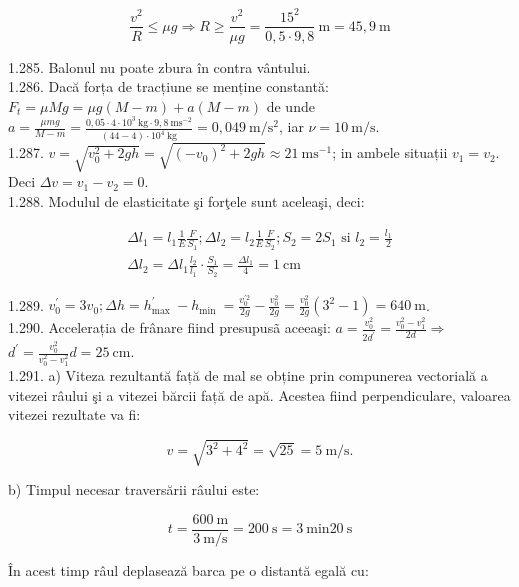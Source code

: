 \documentclass[10pt]{article}
\begin{document}
$$
\frac{v^{2}}{R} \leq \mu g \Rightarrow R \geq \frac{v^{2}}{\mu g}=\frac{15^{2}}{0,5 \cdot 9,8} \mathrm{~m}=45,9 \mathrm{~m}
$$

1.285. Balonul nu poate zbura în contra vântului.\\
1.286. Dacă forța de tracțiune se menține constantă:\\
$F_{t}=\mu M g=\mu g(M-m)+a(M-m)$ de unde\\
$a=\frac{\mu m g}{M-m}=\frac{0,05 \cdot 4 \cdot 10^{3} \mathrm{~kg} \cdot 9,8 \mathrm{~ms}^{-2}}{(44-4) \cdot 10^{4} \mathrm{~kg}}=0,049 \mathrm{~m} / \mathrm{s}^{2}$, iar $\nu=10 \mathrm{~m} / \mathrm{s}$.\\
1.287. $v=\sqrt{v_{0}^{2}+2 g h}=\sqrt{\left(-v_{0}\right)^{2}+2 g h} \approx 21 \mathrm{~ms}^{-1}$; in ambele situații $v_{1}=v_{2}$. Deci $\Delta v=v_{1}-v_{2}=0$.\\
1.288. Modulul de elasticitate şi forţele sunt aceleaşi, deci:

$$
\begin{gathered}
\Delta l_{1}=l_{1} \frac{1}{E} \frac{F}{S_{1}} ; \Delta l_{2}=l_{2} \frac{1}{E} \frac{F}{S_{2}} ; S_{2}=2 S_{1} \text { si } l_{2}=\frac{l_{1}}{2} \\
\Delta l_{2}=\Delta l_{1} \frac{l_{2}}{l_{1}} \cdot \frac{S_{1}}{S_{2}}=\frac{\Delta l_{1}}{4}=1 \mathrm{~cm}
\end{gathered}
$$

1.289. $v_{0}^{\prime}=3 v_{0} ; \Delta h=h_{\text {max }}^{\prime}-h_{\text {min }}=\frac{v_{0}^{\prime 2}}{2 g}-\frac{v_{0}^{2}}{2 g}=\frac{v_{0}^{2}}{2 g}\left(3^{2}-1\right)=640 \mathrm{~m}$.\\
1.290. Accelerația de frânare fiind presupusã aceeaşi: $a=\frac{v_{0}^{2}}{2 d^{\prime}}=\frac{v_{0}^{2}-v_{1}^{2}}{2 d} \Rightarrow$ $d^{\prime}=\frac{v_{0}^{2}}{v_{0}^{2}-v_{1}^{2}} d=25 \mathrm{~cm}$.\\
1.291. a) Viteza rezultantă față de mal se obține prin compunerea vectorială a vitezei râului şi a vitezei bărcii față de apă. Acestea fiind perpendiculare, valoarea vitezei rezultate va fi:

$$
v=\sqrt{3^{2}+4^{2}}=\sqrt{25}=5 \mathrm{~m} / \mathrm{s} .
$$

b) Timpul necesar traversării râului este:

$$
t=\frac{600 \mathrm{~m}}{3 \mathrm{~m} / \mathrm{s}}=200 \mathrm{~s}=3 \mathrm{~min} 20 \mathrm{~s}
$$

În acest timp râul deplasează barca pe o distantă egală cu:
\end{document}
